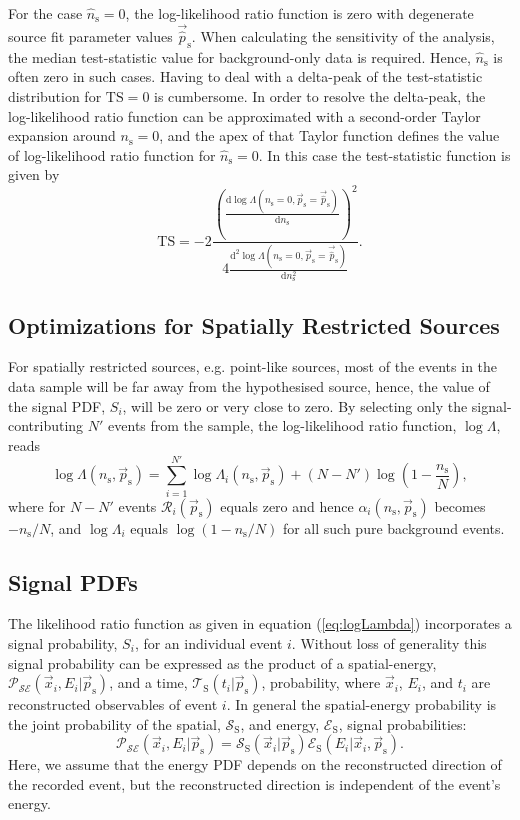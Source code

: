 \documentclass{article}
\newcommand{\eq}[1]{(\ref{#1})}
\newcommand{\ns}{n_{\mathrm{s}}}
\newcommand{\hatns}{\hat{n}_{\mathrm{s}}}
\newcommand{\ps}{\vec{p}_{\mathrm{s}}}
\newcommand{\hatps}{\vec{\hat{p}}_{\mathrm{s}}}
\begin{document}
For the case $\hatns=0$, the log-likelihood ratio function is zero
with degenerate source fit parameter values $\hatps$.
When calculating the sensitivity of the analysis, the median test-statistic value
for background-only data is required. Hence, $\hatns$ is often zero in such cases.
Having to deal with a delta-peak of the test-statistic distribution
for $\mathrm{TS}=0$ is cumbersome. In order to resolve the delta-peak, the
log-likelihood ratio function can be approximated with a second-order Taylor
expansion around $\ns=0$, and the apex of that Taylor function defines the value of
log-likelihood ratio function for $\hatns=0$. In this case the test-statistic
function is given by
\begin{equation}
 \mathrm{TS} = -2\frac{\left(\frac{\mathrm{d}\log\Lambda(\ns=0,\ps=\hatps)}{\mathrm{d}\ns}\right)^2}{4\frac{\mathrm{d}^2\log\Lambda(\ns=0,\ps=\hatps)}{\mathrm{d}\ns^2}}.
\end{equation}

\subsection{Optimizations for Spatially Restricted Sources}

For spatially restricted sources, e.g. point-like sources, most of the events in
the data sample will be far away from the hypothesised source, hence, the value of the
signal PDF, $S_i$, will be zero or very close to zero. By selecting only
the signal-contributing $N'$ events from the sample, the log-likelihood ratio
function, $\log \Lambda$, reads
\begin{equation}
 \log \Lambda(\ns,\ps) = \sum_{i=1}^{N'} \log \Lambda_i(\ns,\ps) + (N - N')\log(1 - \frac{\ns}{N}),
 \label{eq:logLambdaOfXOptimized}
\end{equation}
where for $N-N'$ events $\mathcal{R}_i(\ps)$ equals zero and hence
$\alpha_i(\ns,\ps)$ becomes $-\ns/N$, and $\log \Lambda_i$ equals $\log(1 - \ns/N)$
for all such pure background events.

\subsection{Signal PDFs}

The likelihood ratio function as given in equation \eq{eq:logLambda}
incorporates a signal probability, $S_i$, for an individual event $i$.
Without loss of generality this signal probability can be expressed as the
product of a spatial-energy, $\mathcal{P}_{\mathcal{SE}}(\vec{x}_i,E_i|\ps)$, and a time,
$\mathcal{T}_{\mathrm{S}}(t_i|\ps)$, probability, where $\vec{x}_i$, $E_i$, and $t_i$ are
reconstructed observables of event $i$. In general the spatial-energy probability
is the joint probability of the spatial, $\mathcal{S}_{\mathrm{S}}$, and energy,
$\mathcal{E}_{\mathrm{S}}$, signal probabilities:
\begin{equation}
 \mathcal{P}_{\mathcal{SE}}(\vec{x}_i,E_i|\ps) = \mathcal{S}_{\mathrm{S}}(\vec{x}_i|\ps) \mathcal{E}_{\mathrm{S}}(E_i|\vec{x}_i,\ps).
\end{equation}
Here, we assume that the energy PDF depends on the reconstructed direction of
the recorded event, but the reconstructed direction is independent of the
event's energy.
\end{document}
